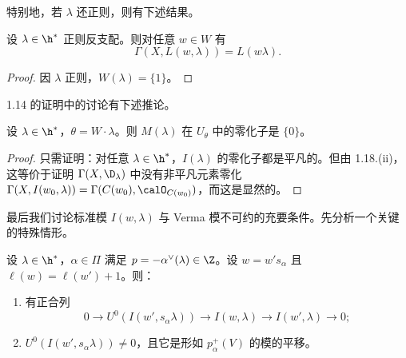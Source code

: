 特别地，若 $\lambda$ 还正则，则有下述结果。

\begin{corollary}\label{cor:05.1.20}
设 $\lambda\in\h^*$ 正则反支配。则对任意 $w\in W$ 有
$$\Gamma(X,L(w,\lambda))=L(w\lambda).$$
\end{corollary}

\begin{proof}
因 $\lambda$ 正则，$W(\lambda)=\{1\}$。
\end{proof}

1.14 的证明中的讨论有下述推论。

\begin{theorem}\label{thm:05.1.21}
设 $\lambda\in\h^*$，$\theta=W\cdot\lambda$。则 $M(\lambda)$ 在 $U_\theta$ 中的零化子是 $\{0\}$。
\end{theorem}

\begin{proof}
只需证明：对任意 $\lambda\in\h^*$，$I(\lambda)$ 的零化子都是平凡的。但由 1.18.(ii)，这等价于证明 $\Gamma(X,\D_\lambda)$ 中没有非平凡元素零化 $\Gamma(X,I(w_0,\lambda))=\Gamma(C(w_0),\calO_{C(w_0)})$，而这是显然的。
\end{proof}

最后我们讨论标准模 $I(w,\lambda)$ 与 Verma 模不可约的充要条件。先分析一个关键的特殊情形。

\begin{lemma}\label{lem:05.1.22}
设 $\lambda\in\h^*$，$\alpha\in\Pi$ 满足 $p=-\alpha^\vee(\lambda)\in\Z$。设 $w=w's_\alpha$ 且 $\ell(w)=\ell(w')+1$。则：
\begin{enumerate}[label=(\roman*)]
\item 有正合列
$$0\longrightarrow U^0(I(w',s_\alpha\lambda))\longrightarrow I(w,\lambda)\longrightarrow I(w',\lambda)\longrightarrow0;$$
\item $U^0(I(w',s_\alpha\lambda))\neq0$，且它是形如 $p_\alpha^+(V)$ 的模的平移。
\end{enumerate}
\end{lemma}

